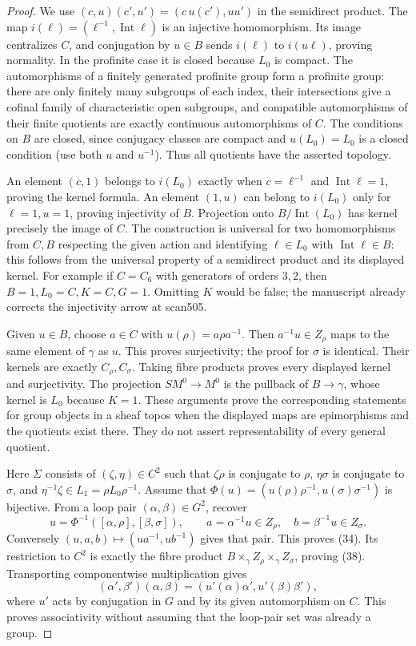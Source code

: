 \begin{proof}
We use $(c,u)(c',u')=(c\,u(c'),uu')$ in the semidirect product.
The map $i(\ell)=(\ell^{-1},\operatorname{Int}\ell)$ is an
injective homomorphism. Its image centralizes $C$, and conjugation
by $u\in B$ sends $i(\ell)$ to $i(u\ell)$, proving normality.
In the profinite case it is closed because $L_0$ is compact.
The automorphisms of a finitely generated profinite group form a
profinite group: there are only finitely many subgroups of each
index, their intersections give a cofinal family of characteristic
open subgroups, and compatible automorphisms of their finite
quotients are exactly continuous automorphisms of $C$.
The conditions on $B$ are closed, since conjugacy classes are
compact and $u(L_0)=L_0$ is a closed condition (use both $u$ and
$u^{-1}$). Thus all quotients have the asserted topology.

An element $(c,1)$ belongs to $i(L_0)$ exactly when
$c=\ell^{-1}$ and $\operatorname{Int}\ell=1$, proving the kernel
formula. An element $(1,u)$ can belong to $i(L_0)$ only for
$\ell=1,u=1$, proving injectivity of $B$. Projection onto
$B/\operatorname{Int}(L_0)$ has kernel precisely the image of $C$.
The construction is universal for two homomorphisms from $C,B$
respecting the given action and identifying $\ell\in L_0$ with
$\operatorname{Int}\ell\in B$: this follows from the universal
property of a semidirect product and its displayed kernel.
For example if $C=C_6$ with generators of orders $3,2$, then
$B=1,L_0=C,K=C,G=1$. Omitting $K$ would be false; the
manuscript already corrects the injectivity arrow at scan505.

Given $u\in B$, choose $a\in C$ with
$u(\rho)=a\rho a^{-1}$. Then $a^{-1}u\in Z_\rho$ maps to the
same element of $\gamma$ as $u$. This proves surjectivity; the
proof for $\sigma$ is identical. Their kernels are exactly
$C_\rho,C_\sigma$. Taking fibre products proves every displayed
kernel and surjectivity. The projection $SM^0\to M^0$ is the
pullback of $B\to\gamma$, whose kernel is $L_0$ because $K=1$.
These arguments prove the corresponding statements for group
objects in a sheaf topos when the displayed maps are epimorphisms
and the quotients exist there. They do not assert representability
of every general quotient.

Here $\Sigma$ consists of $(\zeta,\eta)\in C^2$ such that
$\zeta\rho$ is conjugate to $\rho$, $\eta\sigma$ is conjugate
to $\sigma$, and $\eta^{-1}\zeta\in L_1=\rho L_0\rho^{-1}$.
Assume that $\Phi(u)=(u(\rho)\rho^{-1},u(\sigma)\sigma^{-1})$
is bijective. From a loop pair $(\alpha,\beta)\in G^2$, recover
\[
 u=\Phi^{-1}([\alpha,\rho],[\beta,\sigma]),\qquad
 a=\alpha^{-1}u\in Z_\rho,\quad b=\beta^{-1}u\in Z_\sigma.
\]
Conversely $(u,a,b)\mapsto(ua^{-1},ub^{-1})$ gives that pair.
This proves (34). Its restriction to $C^2$ is exactly the
fibre product $B\times_\gamma Z_\rho\times_\gamma Z_\sigma$,
proving (38). Transporting componentwise multiplication gives
\[
 (\alpha',\beta')(\alpha,\beta)
   =(u'(\alpha)\alpha',u'(\beta)\beta'),
\]
where $u'$ acts by conjugation in $G$ and by its given
automorphism on $C$. This proves associativity without assuming
that the loop-pair set was already a group.


\end{proof}
